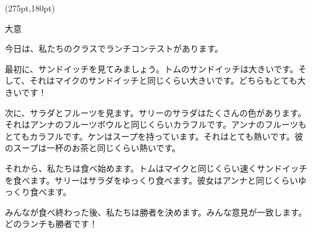 \documentclass[aspectratio=169,xcolor={dvipsnames,table}]{beamer}
\begin{document}
\begin{frame}[plain,t]
\normalsize
\begin{textblock*}{0.4\linewidth}(275pt,180pt)
\end{textblock*}
\end{frame}
\begin{frame}[plain]{大意}
 
今日は、私たちのクラスでランチコンテストがあります。

最初に、サンドイッチを見てみましょう。トムのサンドイッチは大きいです。そして、それはマイクのサンドイッチと同じくらい大きいです。どちらもとても大きいです！

次に、サラダとフルーツを見ます。サリーのサラダはたくさんの色があります。それはアンナのフルーツボウルと同じくらいカラフルです。アンナのフルーツもとてもカラフルです。ケンはスープを持っています。それはとても熱いです。彼のスープは一杯のお茶と同じくらい熱いです。

それから、私たちは食べ始めます。トムはマイクと同じくらい速くサンドイッチを食べます。サリーはサラダをゆっくり食べます。彼女はアンナと同じくらいゆっくり食べます。

みんなが食べ終わった後、私たちは勝者を決めます。みんな意見が一致します。どのランチも勝者です！
\end{frame}
\end{document}
